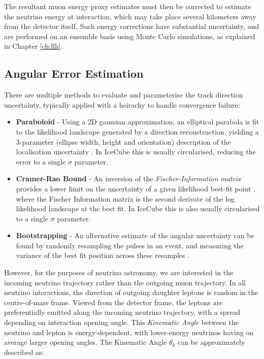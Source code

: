  The resultant muon energy proxy estimates must then be corrected to estimate the neutrino energy at interaction, which may take place several kilometers away from the detector itself. Such energy corrections have substantial uncertainty, and are performed on an ensemble basis using Monte Carlo simulations, as explained in Chapter \ref{ch:llh}.
 
\subsection*{Angular Error Estimation}

There are multiple methods to evaluate and parameterise the track direction uncertainty, typically applied with a heirachy to handle convergence failure:

\begin{itemize}
	\item \textbf{Paraboloid} - Using a 2D gaussian approximation, an elliptical parabola is fit to the likelihood landscape generated by a direction reconstruction, yielding a 3-parameter (ellipse width, height and orientation) description of the localisation uncertainty . In IceCube this is usually circularised, reducing the error to a single $\sigma$ parameter. 
	\item \textbf{Cramer-Rao Bound} - An inversion of the \emph{Fischer-Information matrix} provides a lower limit on the uncertainty of a given likelihood best-fit point , where the Fischer Information matrix is the second derivate of the log likelihood landscape at the best fit.  In IceCube this is also usually circularised to a single $\sigma$ parameter. 
	\item \textbf{Bootstrapping} - An alternative estimate of the angular uncertainty can be found by randomly resampling the pulses in an event, and measuring the variance of the best fit position across these resamples \cite{kintscher_thesis}.
\end{itemize}
 
However, for the purposes of neutrino astronomy, we are interested in the incoming neutrino trajectory rather than the outgoing muon trajectory. In all neutrino interactions, the direction of outgoing daughter leptons is random in the centre-of-mass frame. Viewed from the detector frame, the leptons are preferentially emitted along the incoming neutrino trajectory, with a spread depending on interaction opening angle. This \emph{Kinematic Angle} between the neutrino and lepton is energy-dependent, with lower-energy neutrinos having on average larger opening angles. The Kinematic Angle $\theta_{k} $ can be approximately  described as:


